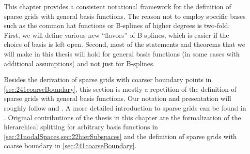 This chapter provides a consistent notational framework
for the definition of sparse grids with general basis functions.
The reason not to employ specific bases such as the common hat functions
or B-splines of higher degrees is two-fold:
First, we will define various new ``flavors'' of B-splines,
which is easier if the choice of basis is left open.
Second, most of the statements and theorems that we will make in this
thesis will hold for general basis functions
(in some cases with additional assumptions)
and not just for B-splines.

Besides the derivation of sparse grids with
coarser boundary points in \cref{sec:241coarseBoundary},
this section is mostly
a repetition of the definition of sparse grids with general basis functions.
Our notation and presentation will roughly follow
\cite{Pflueger10Spatially} and \cite{Garcke13Sparse}.
A more detailed introduction to sparse grids can be found in
\cite{Bungartz04Sparse}.
Original contributions of the thesis in this chapter
are the formalization of the hierarchical splitting for
arbitrary basis functions in \cref{sec:21nodalSpaces,sec:22hierSubspaces} and
the definition of sparse grids with coarse boundary in
\cref{sec:241coarseBoundary}.








\cleardoublepage

